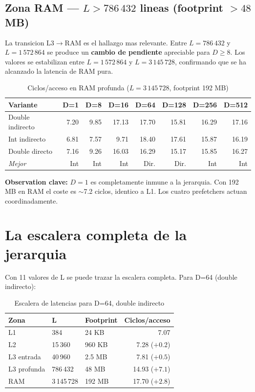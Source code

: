 \documentclass[12pt,a4paper]{article}
\begin{document}
\subsection{Zona RAM --- $L > 786\,432$ lineas (footprint $> 48$ MB)}

La transicion L3$\to$RAM es el hallazgo mas relevante. Entre $L=786\,432$ y $L=1\,572\,864$ se produce un \textbf{cambio de pendiente} apreciable para $D \geq 8$. Los valores se estabilizan entre $L=1\,572\,864$ y $L=3\,145\,728$, confirmando que se ha alcanzado la latencia de RAM pura.

\begin{table}[H]
\centering
\caption{Ciclos/acceso en RAM profunda ($L=3\,145\,728$, footprint 192 MB)}
\label{tab:ram_comparativa}
\footnotesize
\begin{tabular}{lrrrrrrr}
\toprule
\textbf{Variante} & \textbf{D=1} & \textbf{D=8} & \textbf{D=16} & \textbf{D=64} & \textbf{D=128} & \textbf{D=256} & \textbf{D=512} \\
\midrule
Double indirecto & 7.20 & 9.85 & 17.13 & 17.70 & 15.81 & 16.29 & 17.16 \\
Int indirecto    & 6.81 & 7.57 &  9.71 & 18.40 & 17.61 & 15.87 & 16.19 \\
Double directo   & 7.16 & 9.26 & 16.03 & 16.29 & 15.17 & 15.85 & 16.27 \\
\midrule
\textit{Mejor}   & Int  & Int  & Int   & Dir.  & Dir.  & Int   & Int   \\
\bottomrule
\end{tabular}
\end{table}

\textbf{Observation clave:} $D=1$ es completamente inmune a la jerarquia. Con 192 MB en RAM el coste es $\sim$7.2 ciclos, identico a L1. Los cuatro prefetchers actuan coordinadamente.

\section{La escalera completa de la jerarquia}

Con 11 valores de L se puede trazar la escalera completa. Para D=64 (double indirecto):

\begin{table}[H]
\centering
\caption{Escalera de latencias para D=64, double indirecto}
\label{tab:escalera}
\begin{tabular}{lllr}
\toprule
\textbf{Zona} & \textbf{L} & \textbf{Footprint} & \textbf{Ciclos/acceso} \\
\midrule
L1            & 384         & 24 KB   & 7.07 \\
L2            & 15\,360     & 960 KB  & 7.28 ($+0.2$) \\
L3 entrada    & 40\,960     & 2.5 MB  & 7.81 ($+0.5$) \\
L3 profunda   & 786\,432    & 48 MB   & 14.93 ($+7.1$) \\
RAM           & 3\,145\,728 & 192 MB  & 17.70 ($+2.8$) \\
\bottomrule
\end{tabular}
\end{table}
\end{document}
